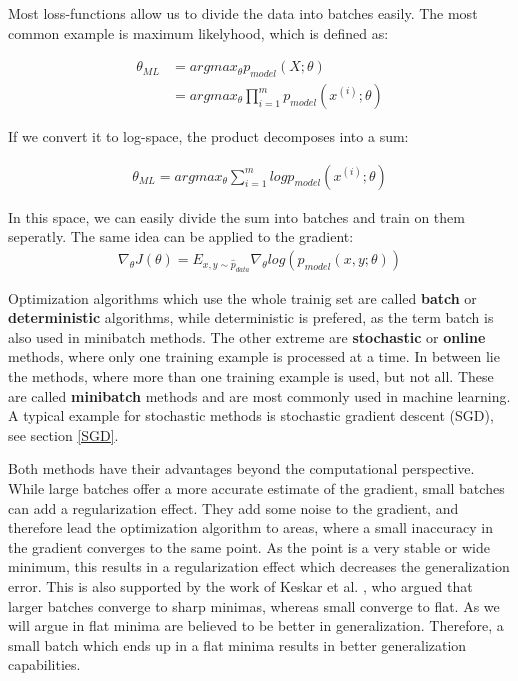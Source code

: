 Most loss-functions allow us to divide the data into batches easily. The most
common example is maximum likelyhood, which is defined as:

\begin{align}
    \theta_{ML}
    & = argmax_{\theta} p_{model}(X; \theta) \\
    & = argmax_{\theta} \prod_{i=1}^m p_{model}(x^{(i)}; \theta)
\end{align}

If we convert it to log-space, the product decomposes into a sum:

\begin{align}
    \theta_{ML} = argmax_{\theta} \sum_{i=1}^m log p_{model}(x^{(i)}; \theta)
\end{align}

In this space, we can easily divide the sum into batches and train on them
seperatly. The same idea can be applied to the gradient:
\begin{align}
    \nabla_\theta J(\theta)=E_{x,y\sim \hat{p}_{data}} \nabla_\theta log(p_{model}(x,y;\theta))
\end{align}

Optimization algorithms which use the whole trainig set are called
\textbf{batch} or \textbf{deterministic} algorithms, while deterministic is
prefered, as the term batch is also used in minibatch methods. The other extreme
are \textbf{stochastic} or \textbf{online} methods, where only one training
example is processed at a time. In between lie the methods, where more than one
training example is used, but not all. These are called \textbf{minibatch}
methods and are most commonly used in machine learning. A typical example for
stochastic methods is stochastic gradient descent (SGD), see section \ref{SGD}.


Both methods have their advantages beyond the computational perspective. While
large batches offer a more accurate estimate of the gradient, small batches can
add a regularization effect. They add some noise to the gradient, and therefore
lead the optimization algorithm to areas, where a small inaccuracy in the
gradient converges to the same point. As the point is a very stable or wide
minimum, this results in a regularization effect which decreases the
generalization error. This is also supported by the work of Keskar et al.
\cite{keskar2016large}, who argued that larger batches converge to sharp
minimas, whereas small converge to flat. As we will argue in flat minima are
believed to be better in generalization. Therefore, a small batch which ends up
in a flat minima results in better generalization capabilities.


